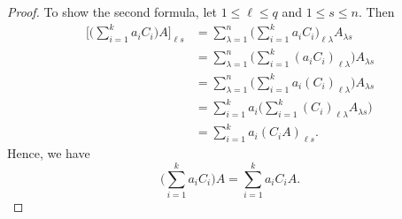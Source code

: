 \begin{proof}
To show the second formula, let \( 1 \leq \ell \leq q  \) and \( 1 \leq  s  \leq n   \). Then
\begin{align*}
    \Big[ \Big( \sum_{ i=1 }^{ k  } {a}_{i} {C}_{i}  \Big) A  \Big]_{\ell s }  &= \sum_{ \lambda = 1  }^{ n   } \Big( \sum_{ i=1 }^{ k  } {a}_{i} {C}_{i} \Big)_{\ell \lambda } {A}_{\lambda s }  \\
                                                                                     &= \sum_{ \lambda = 1  }^{ n } \Big( \sum_{ i=1 }^{  k   } ({a}_{i} {C}_{i})_{\ell \lambda }  \Big) {A}_{\lambda s } \\
                                                                                     &= \sum_{ \lambda = 1  }^{ n } \Big( \sum_{ i=1 }^{  k   } {a}_{i} ({C}_{i})_{\ell \lambda }  \Big) {A}_{\lambda s } \\
                                                                                     &= \sum_{ i =1  }^{ k  } {a}_{i} \Big( \sum_{ i=1  }^{ k  } {({C}_{i})}_{\ell \lambda } {A}_{\lambda s }  \Big) \tag{part (a) of Theorem 2.12}   \\
                                                                                     &= \sum_{ i=1  }^{ k  } {a}_{i} ({C}_{i} A  )_{\ell s }.
\end{align*}
Hence, we have
\[  \Big( \sum_{ i=1  }^{  k  } {a}_{i} {C}_{i}  \Big) A = \sum_{ i=1  }^{ k  } {a}_{i} {C}_{i} A. \]
\end{proof}




